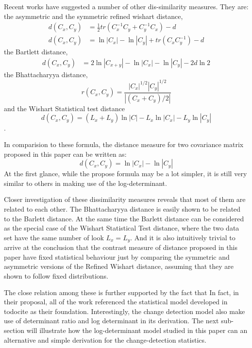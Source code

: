 \documentclass[journal]{IEEEtran}
\begin{document}
Recent works have suggested a number of other dis-similarity measures.
They are: the asymmetric and the symmetric refined wishart distance\cite{Anfinsen_2007_ESA_POLINSAR},
\begin{align}
  d(C_x,C_y) &= \frac{1}{2} tr(C_x^{-1}C_y + C_y^{-1}C_x) - d \\
    d(C_x,C_y) &= \ln|C_x| - \ln|C_y| + tr(C_xC_y^{-1}) - d
\end{align}
the Bartlett distance\cite{Kersten_2005_TGRS_519},
  \begin{align}
  d(C_x,C_y) &= 2 \ln |C_{x+y}| - \ln |C_x| - \ln |C_y| - 2d\ln2
  \end{align}
the Bhattacharyya distance\cite{Lee_2011_IGARSS_3740},
\begin{equation}
  r(C_x,C_y) = \frac{|C_x|^{1/2} |C_y|^{1/2}}{|(C_x+C_y)/2|}
\end{equation}
and the Wishart Statistical test distance\cite{Cao_2007_TGRS_3454}
\begin{equation}
  d(C_x,C_y) = (L_x + L_y) \ln|C| - L_x \ln|C_x| - L_y\ln|C_y|
\end{equation}
.

In comparision to these formula, the distance measure for two covariance matrix proposed in this paper can be written as:
\begin{equation}
  d(C_x,C_y) =  \ln|C_x| - \ln|C_y| 
\end{equation}
At the first glance, while the propose formula may be a lot simpler, it is still very similar to others in making use of the log-determinant.

Closer investigation of these dissimilarity measures reveals that most of them are related to each other.
The Bhattacharyya distance is easily shown to be related to the Barlett distance.
At the same time the Barlett distance can be considered as the special case of the Wishart Statistical Test distance, where the two data set have the same number of look $L_x=L_y$.
And it is also intuitively trivial to arrive at the conclusion that the contrast measure of distance proposed in this paper have fixed statistical behaviour just by comparing the symmetric and asymmetric versions of the Refined Wishart distance, assuming that they are shown to follow fixed distributions.

The close relation among these is further supported by the fact that
In fact, in their proposal, all of the work referenced the statistical model developed in todocite as their foundation.
Interestingly, the change detection model also make use of determinant ratio and log determinant in its derivation.  
The next sub-section will illustrate how the log-determinant model studied in this paper can an alternative and simple derivation for the change-detection statistics.
\end{document}
